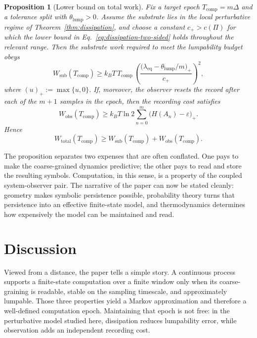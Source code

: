 \documentclass[11pt,a4paper]{article}
\newtheorem{proposition}{Proposition}
\theoremstyle{definition}
\theoremstyle{remark}
\newcommand{\Tc}{T_{\mathrm{comp}}}
\newcommand{\Eqref}[1]{Eq.~\eqref{#1}}
\begin{document}
\begin{proposition}[Lower bound on total work]\label{prop:cost}
Fix a target epoch $\Tc=m\Delta$ and a tolerance split with $\theta_{\mathrm{lump}}>0$. Assume the substrate lies in the local perturbative regime of Theorem~\ref{thm:dissipation}, and choose a constant $c_+>c(\Pi)$ for which the lower bound in \Eqref{eq:dissipation-two-sided} holds throughout the relevant range. Then the substrate work required to meet the lumpability budget obeys
\begin{equation}\label{eq:substrate-bound}
W_{\mathrm{sub}}(\Tc)
\geq
k_BT\,\Tc\,
\left(
\frac{\bigl(\lambda_{\mathrm{eq}}-\theta_{\mathrm{lump}}/m\bigr)_+}{c_+}
\right)^{\!2},
\end{equation}
where $(u)_+ := \max\{u,0\}$. If, moreover, the observer resets the record after each of the $m+1$ samples in the epoch, then the recording cost satisfies
\begin{equation}\label{eq:observer-bound}
W_{\mathrm{obs}}(\Tc)
\geq
k_BT\ln 2
\sum_{n=0}^{m}\bigl(H(A_n)-\varepsilon\bigr)_+.
\end{equation}
Hence
\begin{equation}\label{eq:total-bound}
W_{\mathrm{total}}(\Tc) \geq W_{\mathrm{sub}}(\Tc) + W_{\mathrm{obs}}(\Tc).
\end{equation}
\end{proposition}

The proposition separates two expenses that are often conflated. One pays to make the coarse-grained dynamics predictive; the other pays to read and store the resulting symbols. Computation, in this sense, is a property of the coupled system-observer pair. The narrative of the paper can now be stated cleanly: geometry makes symbolic persistence possible, probability theory turns that persistence into an effective finite-state model, and thermodynamics determines how expensively the model can be maintained and read.

\section{Discussion}\label{sec:discussion}

Viewed from a distance, the paper tells a simple story. A continuous process supports a finite-state computation over a finite window only when its coarse-graining is readable, stable on the sampling timescale, and approximately lumpable. Those three properties yield a Markov approximation and therefore a well-defined computation epoch. Maintaining that epoch is not free: in the perturbative model studied here, dissipation reduces lumpability error, while observation adds an independent recording cost.
\end{document}
